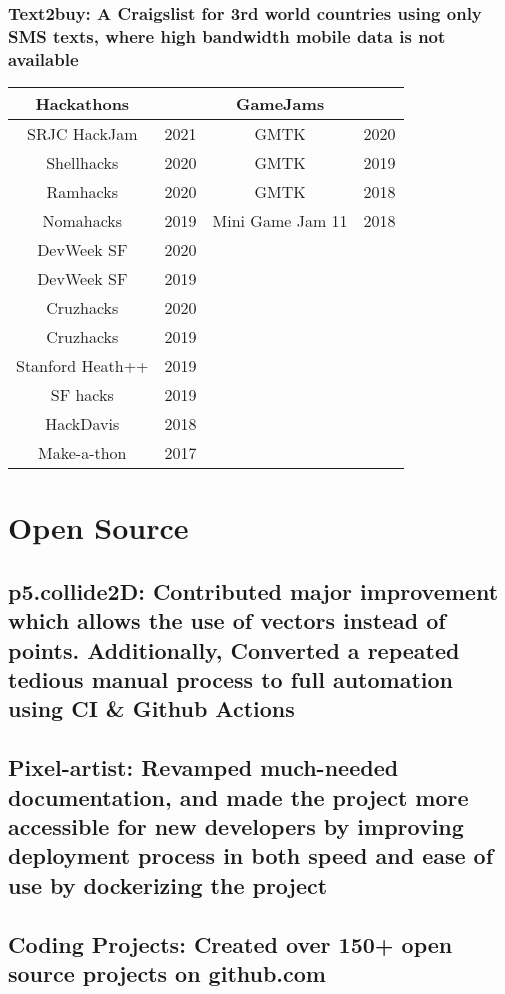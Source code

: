 \documentclass{article}
\begin{document}
	    \subsubsection{Text2buy: A Craigslist for 3rd world countries using only SMS texts, where high bandwidth mobile data is not available}
\begin{flushleft}

    \begin{tabular}{ |c c|c c|  }
        \hline
        Hackathons & & GameJams & \\ \hline
        SRJC HackJam & 2021 & GMTK & 2020 \\ \hline
        Shellhacks & 2020 & GMTK & 2019 \\ \hline
        Ramhacks & 2020 & GMTK & 2018 \\ \hline
        Nomahacks & 2019 & Mini Game Jam 11 & 2018 \\ \hline
        DevWeek SF & 2020 & &  \\ \hline
        DevWeek SF & 2019 & &  \\ \hline
        Cruzhacks & 2020 & &  \\ \hline
        Cruzhacks & 2019 & &  \\ \hline
        Stanford Heath++ & 2019 & &  \\ \hline 
        SF hacks & 2019  & &  \\ \hline 
        HackDavis & 2018  & &  \\ \hline 
        Make-a-thon & 2017  & &  \\ \hline 
        \hline
    \end{tabular}

\end{flushleft}
		
\section{Open Source}

    \subsection{p5.collide2D: Contributed major improvement which allows the use of vectors instead of points. Additionally, Converted a repeated tedious manual process to full automation using CI & Github Actions}
    \subsection{Pixel-artist: Revamped much-needed documentation, and made the project more accessible for new developers by improving deployment process in both speed and ease of use by dockerizing the project }
    \subsection{Coding Projects: Created over 150+ open source projects on github.com}		
\end{document}
